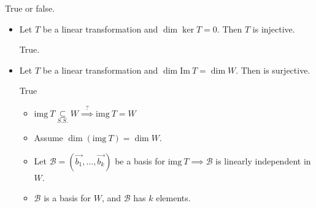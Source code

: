 \documentclass[11pt,fleqn]{book} %
\begin{document}
\begin{example}
    True or false. 
    
    \begin{itemize}
        \item Let $T$ be a linear transformation and $\dim \ker T = 0$. Then $T$ is injective. 

        True. 
        
        \item Let $T$ be a linear transformation and $\dim \mathrm{Im}~T = \dim W$. Then  is surjective. 
        
        True
        \begin{itemize}
            \item $\mathrm{img}~T \underset{S.S.}{\subseteq} W \overset{?}{\implies} \mathrm{img}~T = W$
            \item Assume $\dim\left( \mathrm{img}~T \right) = \dim W$. 
            \item Let $\mathcal{B} = \left( \overrightarrow{b_1}, \dots, \overrightarrow{b_k} \right)$ be a basis for $\mathrm{img}~T \implies \mathcal{B}$ is linearly independent in $W$. 
            \item $\mathcal{B}$ is a basis for $W$, and $\mathcal{B}$ has $k$ elements. 
        \end{itemize}
    \end{itemize}
\end{example}
\end{document}
